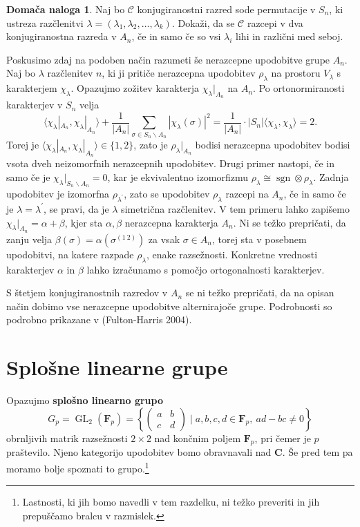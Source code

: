 \documentclass[11pt]{book}
\def\CC{\mathbf{C}}
\def\conclass{\mathcal{C}}
\def\FF{\mathbf{F}}
\DeclareMathOperator\sgn{sgn}
\DeclareMathOperator\GL{GL}
\def\definicija{\color{rdeca}\bf}
\def\literatura{\color{modra}}
\theoremstyle{definition}
\theoremstyle{zgled}
\theoremstyle{zgledbrezstevilke}
\theoremstyle{odprtproblem}
\theoremstyle{domacanaloga}
\newtheorem{domacanaloga}[theorem]{Domača naloga}
\theoremstyle{izrek}
\begin{document}
\begin{domacanaloga}
Naj bo $\conclass$ konjugiranostni razred sode permutacije v $S_n$, ki ustreza razčlenitvi $\lambda = (\lambda_1, \lambda_2, \dots, \lambda_k)$. Dokaži, da se $\conclass$ razcepi v dva konjugiranostna razreda v $A_n$, če in samo če so vsi $\lambda_i$ lihi in različni med seboj.
\end{domacanaloga}

Poskusimo zdaj na podoben način razumeti še nerazcepne upodobitve grupe $A_n$. Naj bo $\lambda$ razčlenitev $n$, ki ji pritiče nerazcepna upodobitev $\rho_{\lambda}$ na prostoru $V_{\lambda}$ s karakterjem $\chi_{\lambda}$. Opazujmo zožitev karakterja $\chi_{\lambda}|_{A_n}$ na $A_n$. Po ortonormiranosti karakterjev v $S_n$ velja
\[
    \langle \chi_{\lambda}|_{A_n}, \chi_{\lambda}|_{A_n} \rangle
    +
    \frac{1}{|A_n|} \sum_{\sigma \in S_n \backslash A_n} |\chi_{\lambda}(\sigma)|^2
    =
    \frac{1}{|A_n|} \cdot |S_n| \langle \chi_{\lambda}, \chi_{\lambda} \rangle
    = 2.
\]
Torej je $\langle \chi_{\lambda}|_{A_n}, \chi_{\lambda}|_{A_n} \rangle \in \{ 1, 2 \}$, zato je $\rho_{\lambda}|_{A_n}$ bodisi nerazcepna upodobitev bodisi vsota dveh neizomorfnih nerazcepnih upodobitev. Drugi primer nastopi, če in samo če je $\chi_{\lambda}|_{S_n \backslash A_n} = 0$, kar je ekvivalentno izomorfizmu $\rho_{\lambda} \cong \sgn \otimes \rho_{\lambda}$. Zadnja upodobitev je izomorfna $\rho_{\lambda^\prime}$, zato se upodobitev $\rho_{\lambda}$ razcepi na $A_n$, če in samo če je $\lambda = \lambda^\prime$, se pravi, da je $\lambda$ simetrična razčlenitev. V tem primeru lahko zapišemo $\chi_{\lambda}|_{A_n} = \alpha + \beta$, kjer sta $\alpha, \beta$ nerazcepna karakterja $A_n$. Ni se težko prepričati, da zanju velja $\beta(\sigma) = \alpha(\sigma^{(1 \ 2)})$ za vsak $\sigma \in A_n$, torej sta v posebnem upodobitvi, na katere razpade $\rho_{\lambda}$, enake razsežnosti. Konkretne vrednosti karakterjev $\alpha$ in $\beta$ lahko izračunamo s pomočjo ortogonalnosti karakterjev. 

S štetjem konjugiranostnih razredov v $A_n$ se ni težko prepričati, da na opisan način dobimo vse nerazcepne upodobitve alternirajoče grupe. Podrobnosti so podrobno prikazane v {\literatura (Fulton-Harris 2004)}.


\section{Splošne linearne grupe}

Opazujmo {\definicija splošno linearno grupo}
\[
    G_p = {\textstyle \GL_2(\FF_p)} =
    \left\{ \begin{pmatrix} a & b \\ c & d \end{pmatrix} \mid a,b,c,d \in \FF_p, \ ad - bc \neq 0 \right\}
\] 
obrnljivih matrik razsežnosti $2 \times 2$ nad končnim poljem $\FF_p$, pri čemer je $p$ praštevilo. Njeno kategorijo upodobitev bomo obravnavali nad $\CC$. Še pred tem pa moramo bolje spoznati to grupo.\footnote{Lastnosti, ki jih bomo navedli v tem razdelku, ni težko preveriti in jih prepuščamo bralcu v razmislek.}
\end{document}

